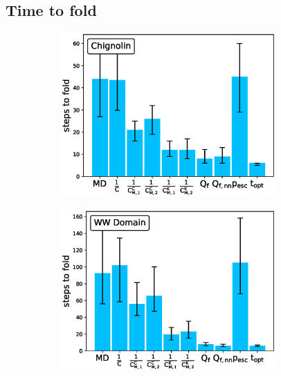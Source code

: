 \subsection{\label{sec:time-fold}Time to fold}

\begin{figure}[H]
  \begin{subfigure}[t]{0.5\textwidth}
    \includegraphics[width=0.9\textwidth]{figures/CLN025_7_steps10000_nparallel100_fold.eps} 
  \end{subfigure}
  \begin{subfigure}[t]{0.5\textwidth}
    \includegraphics[width=0.9\textwidth]{figures/GTT_7_steps10000_nparallel100_fold.eps}  
  \end{subfigure}
  \begin{subfigure}[t]{0.5\textwidth}

\end{subfigure}
\end{figure}
